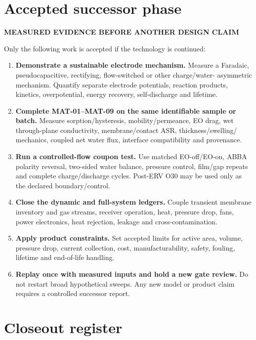 \documentclass[10pt,a4paper]{article}
\newcommand{\sans}{\fontfamily{qhv}\selectfont}
\newcommand{\eyebrow}[1]{{\sans\bfseries\color{Teal}\MakeUppercase{#1}}\par\vspace{1.2mm}}
\begin{document}
\section{Accepted successor phase}
\eyebrow{Measured evidence before another design claim}

Only the following work is accepted if the technology is continued:

\begin{enumerate}
  \item \textbf{Demonstrate a sustainable electrode mechanism.} Measure a
  Faradaic, pseudocapacitive, rectifying, flow-switched or other charge/water-
  asymmetric mechanism. Quantify separate electrode potentials, reaction
  products, kinetics, overpotential, energy recovery, self-discharge and lifetime.
  \item \textbf{Complete MAT-01--MAT-09 on the same identifiable sample or
  batch.} Measure sorption/hysteresis, mobility/permeance, EO drag, wet
  through-plane conductivity, membrane/contact ASR, thickness/swelling/
  mechanics, coupled net water flux, interface compatibility and provenance.
  \item \textbf{Run a controlled-flow coupon test.} Use matched EO-off/EO-on,
  ABBA polarity reversal, two-sided water balance, pressure control, film/gap
  repeats and complete charge/discharge cycles. Post-ERV O30 may be used only
  as the declared boundary/control.
  \item \textbf{Close the dynamic and full-system ledgers.} Couple transient
  membrane inventory and gas streams, receiver operation, heat, pressure drop,
  fans, power electronics, heat rejection, leakage and cross-contamination.
  \item \textbf{Apply product constraints.} Set accepted limits for active
  area, volume, pressure drop, current collection, cost, manufacturability,
  safety, fouling, lifetime and end-of-life handling.
  \item \textbf{Replay once with measured inputs and hold a new gate review.}
  Do not restart broad hypothetical sweeps. Any new model or product claim
  requires a controlled successor report.
\end{enumerate}

\clearpage
\section{Closeout register}
\end{document}
